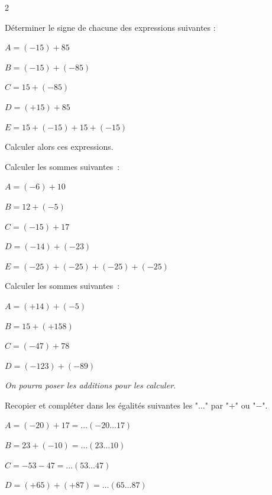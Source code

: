 \begin{multicols}{2}


\begin{exercice}{}{}
    Déterminer le signe de chacune des expressions suivantes :
    \begin{enumeratebf}
        \item $A=(-15)+85$
        \item $B=(-15)+(-85)$
        \item $C=15+(-85)$
        \item $D=(+15)+85$
        \item $E=15+(-15)+15+(-15)$
    \end{enumeratebf}
    Calculer alors ces expressions.
\end{exercice}

\begin{exercice}{}{}
    Calculer les sommes suivantes~:
    \begin{enumeratebf}
        \item $A=(-6)+10$
        \item $B=12+(-5)$
        \item $C=(-15)+17$
        \item $D=(-14)+(-23)$
        \item $E=(-25)+(-25)+(-25)+(-25)$
    \end{enumeratebf}
\end{exercice}
\begin{exercice}{}{}
    Calculer les sommes suivantes~:
    \begin{enumeratebf}
        \item $A=(+14)+(-5)$
        \item $B=15+(+158)$
        \item $C=(-47)+78$
        \item $D=(-123)+(-89)$
    \end{enumeratebf}
    \textit{On pourra poser les additions pour les calculer.}
\end{exercice}

\begin{exercice}{}{}
    Recopier et compléter dans les égalités suivantes les "$\dots$" par "$+$" ou "$-$".
    \begin{enumeratebf}
        \item $A = (-20)+17 = \dots(-20 \dots 17)$
        \item $B = 23 + (-10) = \dots(23 \dots 10)$
        \item $C = -53 - 47 = \dots(53 \dots 47)$
        \item $D = (+65) + (+87) = \dots(65 \dots 87)$
    \end{enumeratebf}
\end{exercice}

\end{multicols}
